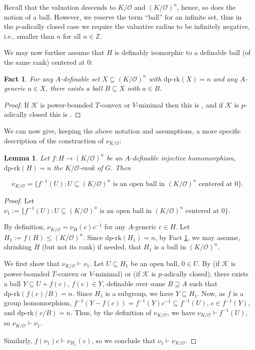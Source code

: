 \documentclass[11pt]{amsart}
\newtheorem{fact}[theorem]{Fact}
\newtheorem{lemma}[theorem]{Lemma}
\theoremstyle{definition}
\newcommand{\CK}{{\mathcal K}}
\newcommand{\CO}{{\mathcal O}}
\newcommand{\0}{\emptyset}
\def\dpr{\mathrm{dp\text{-}rk}}
\begin{document}



Recall that the valuation descends to $K/\CO$ and $(K/\CO)^n$, hence, so does the notion of a ball. However, we reserve the term ``ball'' for an infinite set, thus in the $p$-adically closed case we require the valuative radius to be infinitely negative, i.e., smaller than $n$ for all  $n\in  \mathbb{Z}$. 

We may now further assume that $H$ is definably isomorphic to a definable ball (of the same rank) centered at $0$:
\begin{fact}\label{F:interior in K/O}
    For any $A$-definable set $X\subseteq (K/\CO)^n$ with $\dpr(X)=n$ and any $A$-generic $a\in X$, there exists a ball $B\subseteq X$ with $a\in B$.
\end{fact}
\begin{proof}
    If $\CK$ is power-bounded $T$-convex or $V$-minimal then this is \cite[Corollary 2.7]{SimWal}, and if $\CK$ is $p$-adically closed this is \cite[Lemma 3.6]{HaHaPeGps}.
\end{proof}

We can now give, keeping the above notation and assumptions,  a more specific description of the construction of $\nu_{K/\CO}$: 
\begin{lemma}\label{F: nu in K/O}
Let $f:H\to (K/\CO)^n$ be an $A$-definable injective homomorphism,  $\dpr(H)=n$  the $K/\CO$-rank of $G$. Then 

 \[\nu_{K/\CO}=\{f^{-1}(U): U\subseteq (K/\CO)^n \text{ is an open ball in $(K/\CO)^n$ centered at $0$}\}.\]
\end{lemma}
\begin{proof} 

Let  $\nu_1:=\{f^{-1}(U): U\subseteq (K/\CO)^n \text{ is an open ball in $(K/\CO)^n$ centered at $0$}\}$. 


By definition,  $\nu_{K/\CO}=\nu_H(c)c^{-1}$ for any $A$-generic $c\in H$. Let $H_1 :=f(H)\le  (K/\CO)^n$.
Since $\dpr(H_1)=n$, by Fact \ref{F:interior in K/O}, we may assume, shrinking $H$ (but not its rank) if needed, that  $H_1$ is a ball in $(K/\CO)^n$. 

We first show that $\nu_{K/\CO}\vdash \nu_1$.
Let $U\subseteq H_1$ be an open ball, $0\in U$. By \cite[Proposition 3.12]{HaHaPeVF} (if $\CK$ is power-bounded $T$-convex or $V$-minimal) or \cite[Proposition 3.8]{HaHaPeGps} (if $\CK$ is $p$-adically closed), there exists a ball $Y\subseteq U+f(c)$, $f(c)\in Y$, definable over some $B\supseteq A$ such that $\dpr(f(c)/B)=n$. Since $H_1$ is a subgroup, we have $Y\subseteq H_1$. Now, as $f$ is a group homomorphism, $f^{-1}(Y-f(c))=f^{-1}(Y)c^{-1}\subseteq f^{-1}(U)$, $c\in f^{-1}(Y)$,  and $\dpr(c/B)=n$. Thus, by the definition of $\nu_{K/\CO}$, we have $\nu_{K/\CO}\vdash f^{-1}(U)$, so $\nu_{K/\CO}\vdash \nu_1$. 

Similarly,  $f(\nu_1)c\vdash \nu_{H_1}(c)$, so we conclude that $\nu_1\vdash \nu_{K/\CO}$.
\end{proof}
\end{document}

